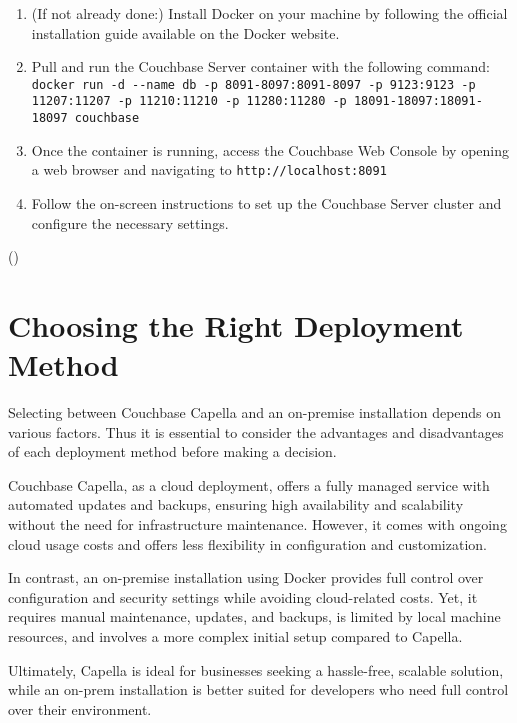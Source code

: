 \begin{enumerate}
  \item (If not already done:) Install Docker on your machine by following the official installation guide available on the Docker website.
  \item Pull and run the Couchbase Server container with the following command: \\
  \lstinline|docker run -d --name db -p 8091-8097:8091-8097 -p 9123:9123 -p 11207:11207 -p 11210:11210 -p 11280:11280 -p 18091-18097:18091-18097 couchbase| 
  \item Once the container is running, access the Couchbase Web Console by opening a web browser and navigating to \lstinline|http://localhost:8091|
  \item Follow the on-screen instructions to set up the Couchbase Server cluster and configure the necessary settings.
\end{enumerate}
(\cite{couchbaseDocker})

\section{Choosing the Right Deployment Method}
Selecting between Couchbase Capella and an on-premise installation depends on various factors. Thus it is essential to consider the advantages and disadvantages of each deployment method before making a decision.

Couchbase Capella, as a cloud deployment, offers a fully managed service with automated updates and backups, ensuring high availability and scalability without the need for infrastructure maintenance. However, it comes with ongoing cloud usage costs and offers less flexibility in configuration and customization. 

In contrast, an on-premise installation using Docker provides full control over configuration and security settings while avoiding cloud-related costs. Yet, it requires manual maintenance, updates, and backups, is limited by local machine resources, and involves a more complex initial setup compared to Capella. 

Ultimately, Capella is ideal for businesses seeking a hassle-free, scalable solution, while an on-prem installation is better suited for developers who need full control over their environment.









